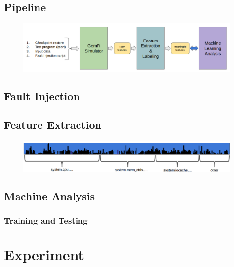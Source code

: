 \documentclass{sig-alternate}
\begin{document}
\subsection{Pipeline}

\begin{figure}[t]
\begin{center}
   \includegraphics[width=0.95\linewidth]{./figures/pipeline.png}
\end{center}
   \caption{}
\label{fig:pipeline}
\end{figure}

\subsection{Fault Injection}

\subsection{Feature Extraction}

\begin{figure}[t]
\begin{center}
   \includegraphics[width=0.95\linewidth]{./figures/feat_dist.png}
\end{center}
   \caption{}
\label{fig:feat-dist}
\end{figure}

\subsection{Machine Analysis}

\subsubsection{Training and Testing}

\section{Experiment}
\end{document}
